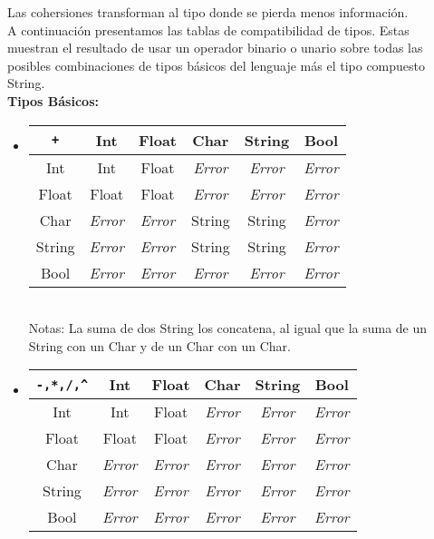 \documentclass[12pt, spanish]{report}
\begin{document}
\indent Las cohersiones transforman al tipo donde se pierda menos informaci\'on.\\

\indent A continuaci\'on presentamos las tablas de compatibilidad de
tipos. Estas muestran el resultado de usar un operador binario o unario sobre
todas las posibles combinaciones de tipos b\'asicos del lenguaje m\'as
el tipo compuesto String.\\

\textbf{Tipos B\'asicos:}
\begin{itemize}
\item
\begin{tabular}{|c||ccccc|}
	\hline
\texttt{+}  &  Int    &        Float & Char         &      String  & Bool  \\
	\hline \hline
Int    & Int          & Float        & \emph{Error} & \emph{Error} & \emph{Error} \\
Float  & Float        & Float        & \emph{Error} & \emph{Error} & \emph{Error}\\
Char   & \emph{Error} & \emph{Error} & String       & String       & \emph{Error}\\
String & \emph{Error} & \emph{Error} & String       & String       & \emph{Error}\\
Bool   & \emph{Error} & \emph{Error} & \emph{Error} & \emph{Error} & \emph{Error}\\
	\hline
\end{tabular}\\
Notas: La suma de dos String los concatena, al igual que la suma de un String
con un Char y de un Char con un Char.

\item
\begin{tabular}{|c||ccccc|}
	\hline
\texttt{-,*,/,\^}  &  Int  & Float & Char  & String & Bool  \\
	\hline \hline
Int    & Int   & Float & \emph{Error} & \emph{Error} & \emph{Error}\\
Float  & Float & Float & \emph{Error} & \emph{Error} & \emph{Error}\\
Char   & \emph{Error} & \emph{Error} & \emph{Error} & \emph{Error} & \emph{Error} \\
String & \emph{Error} & \emph{Error} & \emph{Error} & \emph{Error} & \emph{Error} \\
Bool   & \emph{Error} & \emph{Error} & \emph{Error} & \emph{Error} & \emph{Error} \\
	\hline
\end{tabular}\\


\end{itemize}
\end{document}
